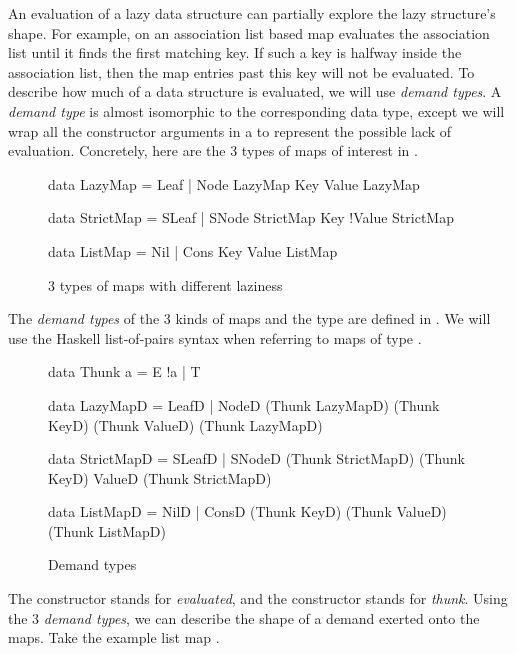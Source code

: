 \documentclass[acmsmall,review]{acmart}\settopmatter{}
\begin{document}
An evaluation of a lazy data structure can partially explore the lazy
structure's shape. For example,  on an association list
based map evaluates the association list until it finds the first
matching key. If such a key is halfway inside the association list,
then the map entries past this key will not be evaluated.
%
To describe how much of a data structure is evaluated, we will
use \textit{demand types}. A \textit{demand type} is almost isomorphic
to the corresponding data type, except we will wrap all the
constructor arguments in a  to represent the possible lack
of evaluation.
%
Concretely, here are the 3 types of maps of interest
in .
%
\begin{figure}[H]
\centering
\begin{inlinecode}
data LazyMap   = Leaf
               | Node LazyMap Key Value LazyMap

data StrictMap = SLeaf
               | SNode StrictMap Key !Value StrictMap

data ListMap   = Nil
               | Cons Key Value ListMap
\end{inlinecode}
\caption{3 types of maps with different laziness}
\label{fig:map-types}
\end{figure}
%
The \textit{demand types} of the 3 kinds of maps and the 
type are defined in . We will use the
Haskell list-of-pairs syntax when referring to maps of
type .
%
\begin{figure}[H]
\centering
\begin{inlinecode}
data Thunk a    = E !a
                | T

data LazyMapD   = LeafD
                | NodeD (Thunk LazyMapD)
                        (Thunk KeyD)
                        (Thunk ValueD)
                        (Thunk LazyMapD)

data StrictMapD = SLeafD
                | SNodeD (Thunk StrictMapD)
                         (Thunk KeyD)
                         ValueD
                         (Thunk StrictMapD)

data ListMapD   = NilD
                | ConsD (Thunk KeyD)
                        (Thunk ValueD)
                        (Thunk ListMapD)
\end{inlinecode}
\caption{Demand types}
\label{fig:map-demand-types}
\end{figure}
%
The  constructor stands for \textit{evaluated}, and the 
constructor stands for \textit{thunk}. Using the 3 \textit{demand
types}, we can describe the shape of a demand exerted onto the
maps. Take the example list map \lk{[(1, 1), (2, 2), (3, 3)]}.
\fi
\end{document}
